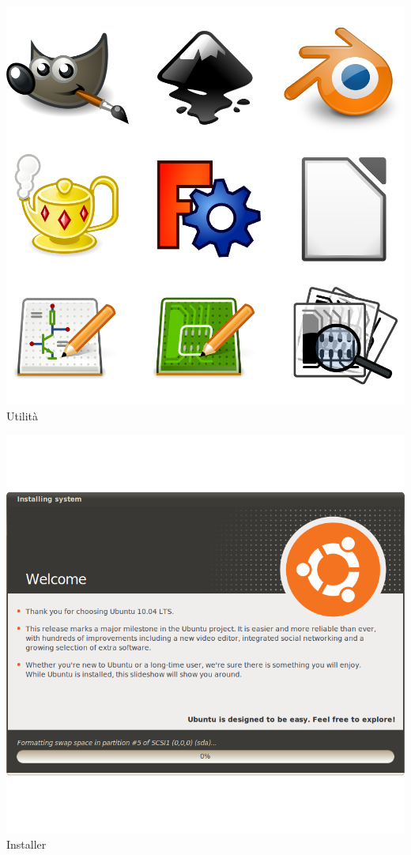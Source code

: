 \documentclass{beamer}
\begin{document}
\begin{frame}
    \begin{minipage}[b][.35\textheight][t]{.3\textwidth}
    \includegraphics[width=.7\textwidth]{img/oss.png}\\
    \centering
    Utilità
    \end{minipage}\hfill
    \begin{minipage}[b][.35\textheight][t]{.3\textwidth}
    \includegraphics[width=.7\textwidth]{img/ubiquity.png}\\
    \centering
    Installer
    \end{minipage}\hfill
    \begin{minipage}[b][.35\textheight][t]{.3\textwidth}

\end{minipage}
\end{frame}
\end{document}
